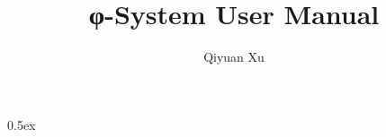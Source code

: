 \documentclass[12pt,a4paper,fleqn]{article}
\begin{document}
\title{φ-System User Manual}
\author{Qiyuan Xu}
\maketitle

\parindent 0pt\parskip 0.5ex



%
%
\end{document}
